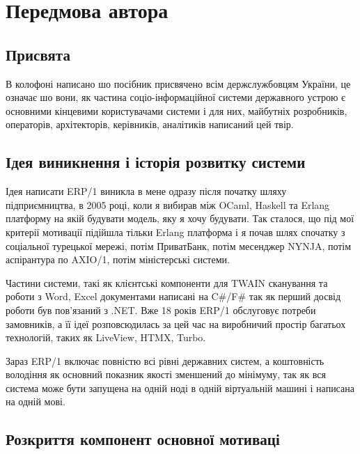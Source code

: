 \chapter*{Передмова автора}

\section*{Присвята}

В колофоні написано шо посібник присвячено всім держслужбовцям України,
це означає шо вони, як частина соціо-інформаційної системи державного устрою
є основними кінцевими користувачами системи і для них, майбутніх розробників,
операторів, архітекторів, керівників, аналітиків написаний цей твір.

\section*{Ідея виникнення і історія розвитку системи}

Ідея написати ERP/1 виникла в мене одразу після початку шляху
підприємництва, в 2005 році, коли я вибирав між OCaml, Haskell та Erlang платформу
на якій будувати модель, яку я хочу будувати. Так сталося, що під мої
критерії мотивації підійшла тільки Erlang платформа і я почав шлях
спочатку з соціальної турецької мережі, потім ПриватБанк, потім месенджер NYNJA,
потім аспірантура по AXIO/1, потім міністерські системи.

Частини системи, такі як клієнтські компоненти для TWAIN сканування та роботи з Word, Excel
документами написані на C\#/F\# так як перший досвід роботи був пов'язаний з .NET.
Вже 18 років ERP/1 обслуговує потреби замовників, а її ідеї розповсюдилась за цей час
на виробничий простір багатьох технологій, таких як LiveView, HTMX, Turbo.

Зараз ERP/1 включає повністю всі рівні державних систем, а коштовність
володіння як основний показник якості зменшений до мінімуму, так як вся система
може бути запущена на одній ноді в одній віртуальній машині і написана на одній мові.

\newpage
\section*{Розкриття компонент основної мотиваці}

